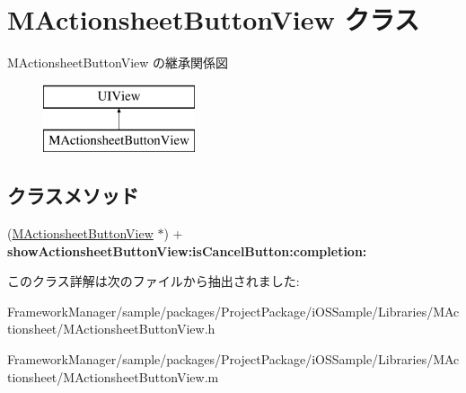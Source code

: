 \hypertarget{interface_m_actionsheet_button_view}{}\section{M\+Actionsheet\+Button\+View クラス}
\label{interface_m_actionsheet_button_view}
M\+Actionsheet\+Button\+View の継承関係図\begin{figure}[H]
\begin{center}
\leavevmode
\includegraphics[height=2.000000cm]{interface_m_actionsheet_button_view}
\end{center}
\end{figure}
\subsection*{クラスメソッド}
\begin{DoxyCompactItemize}
\item 
\hypertarget{interface_m_actionsheet_button_view_af1a473e150ecf6513bab89d52d4bd049}{}(\hyperlink{interface_m_actionsheet_button_view}{M\+Actionsheet\+Button\+View} $\ast$) + {\bfseries show\+Actionsheet\+Button\+View\+:is\+Cancel\+Button\+:completion\+:}\label{interface_m_actionsheet_button_view_af1a473e150ecf6513bab89d52d4bd049}

\end{DoxyCompactItemize}


このクラス詳解は次のファイルから抽出されました\+:\begin{DoxyCompactItemize}
\item 
Framework\+Manager/sample/packages/\+Project\+Package/i\+O\+S\+Sample/\+Libraries/\+M\+Actionsheet/M\+Actionsheet\+Button\+View.\+h\item 
Framework\+Manager/sample/packages/\+Project\+Package/i\+O\+S\+Sample/\+Libraries/\+M\+Actionsheet/M\+Actionsheet\+Button\+View.\+m\end{DoxyCompactItemize}
